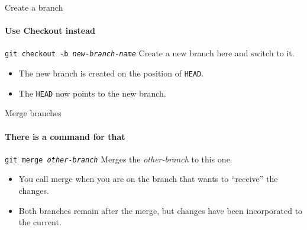 \documentclass[aspectratio=169]{beamer}
\begin{document}
\begin{frame}{Create a branch}
\framesubtitle{Use Checkout instead}

\begin{block}{	\texttt{git checkout -b \emph{new-branch-name}}}
	Create a new branch here and switch to it.
\end{block}

\begin{itemize}
	\item The new branch is created on the position of \texttt{HEAD}.
	\item The \texttt{HEAD} now points to the new branch.
\end{itemize}

\end{frame}

\begin{frame}{Merge branches}
\framesubtitle{There is a command for that}

\begin{block}{	\texttt{git merge \emph{other-branch}}}
	Merges the \emph{other-branch} to this one.
\end{block}

\begin{itemize}
	\item You call merge when you are on the branch that wants to ``receive'' the changes.
	\item Both branches remain after the merge, but changes have been incorporated to the current.
\end{itemize}

\end{frame}
\end{document}

